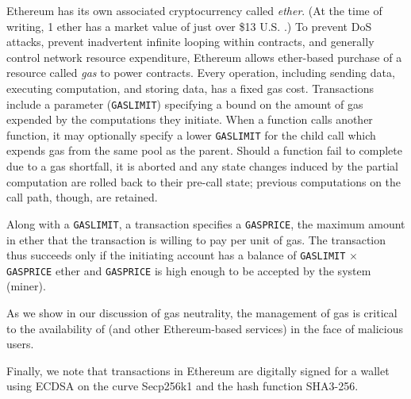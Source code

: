 Ethereum has its own associated cryptocurrency called \emph{ether}. (At the time of writing, 1 ether has a market value of just over \$13 U.S. \cite{ethprice}.)
To prevent DoS attacks, prevent inadvertent infinite looping within contracts, and generally control network resource expenditure,
Ethereum allows ether-based purchase of a resource called \emph{gas} to power contracts.
Every operation, including sending data, executing computation, and storing data, has a fixed gas cost.
Transactions include a parameter (\texttt{GASLIMIT}) specifying a bound on the amount of gas expended by the computations they initiate.
When a function calls another function, it may optionally specify a lower \texttt{GASLIMIT} for the child call which expends gas from the same pool as the parent.
Should a function fail to complete due to a gas shortfall,
it is aborted and any state changes induced by the partial computation are rolled back to their pre-call state;
previous computations on the call path, though, are retained.

Along with a \texttt{GASLIMIT}, a transaction specifies a \texttt{GASPRICE}, the maximum amount in ether that the transaction is willing to pay per unit of gas. The transaction thus succeeds only if the initiating account has a balance of \texttt{GASLIMIT} $\times$ \texttt{GASPRICE} ether and \texttt{GASPRICE} is high enough to be accepted by the system (miner). 

As we show in our discussion of gas neutrality, the management of gas is critical to the availability of \tc (and other Ethereum-based services) in the face of malicious users.

Finally, we note that transactions in Ethereum are digitally signed for a wallet using ECDSA on the curve Secp256k1 and the hash function SHA3-256.



